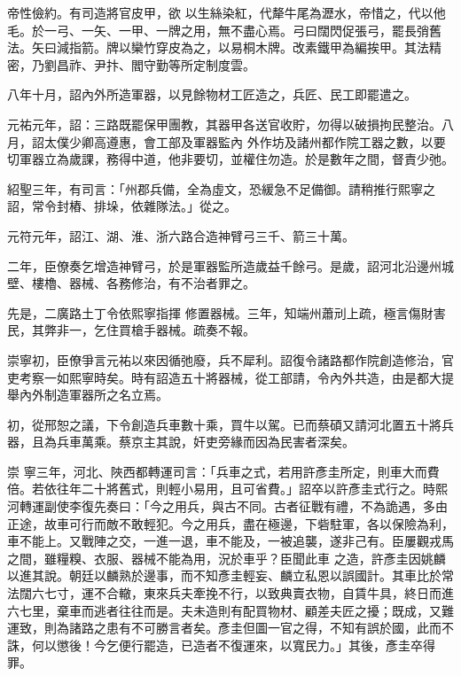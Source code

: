 \begin{pinyinscope}
 帝性儉約。有司造將官皮甲，欲
 以生絲染紅，代犛牛尾為瀝水，帝惜之，代以他毛。於一弓、一矢、一甲、一牌之用，無不盡心焉。弓曰闊閃促張弓，罷長弰舊法。矢曰減指箭。牌以欒竹穿皮為之，以易桐木牌。改素鐵甲為編挨甲。其法精密，乃劉昌祚、尹抃、閻守勤等所定制度雲。



 八年十月，詔內外所造軍器，以見餘物材工匠造之，兵匠、民工即罷遣之。



 元祐元年，詔：三路既罷保甲團教，其器甲各送官收貯，勿得以破損拘民整治。八月，詔太僕少卿高遵惠，會工部及軍器監內
 外作坊及諸州都作院工器之數，以要切軍器立為歲課，務得中道，他非要切，並權住勿造。於是數年之間，督責少弛。



 紹聖三年，有司言：「州郡兵備，全為虛文，恐緩急不足備御。請稍推行熙寧之詔，常令封樁、排垛，依雜隊法。」從之。



 元符元年，詔江、湖、淮、浙六路合造神臂弓三千、箭三十萬。



 二年，臣僚奏乞增造神臂弓，於是軍器監所造歲益千餘弓。是歲，詔河北沿邊州城壁、樓櫓、器械、各務修治，有不治者罪之。



 先是，二廣路土丁令依熙寧指揮
 修置器械。三年，知端州蕭刓上疏，極言傷財害民，其弊非一，乞住買槍手器械。疏奏不報。



 崇寧初，臣僚爭言元祐以來因循弛廢，兵不犀利。詔復令諸路都作院創造修治，官吏考察一如熙寧時矣。時有詔造五十將器械，從工部請，令內外共造，由是都大提舉內外制造軍器所之名立焉。



 初，從邢恕之議，下令創造兵車數十乘，買牛以駕。已而蔡碩又請河北置五十將兵器，且為兵車萬乘。蔡京主其說，奸吏旁緣而因為民害者深矣。



 崇
 寧三年，河北、陜西都轉運司言：「兵車之式，若用許彥圭所定，則車大而費倍。若依往年二十將舊式，則輕小易用，且可省費。」詔卒以許彥圭式行之。時熙河轉運副使李復先奏曰：「今之用兵，與古不同。古者征戰有禮，不為詭遇，多由正途，故車可行而敵不敢輕犯。今之用兵，盡在極邊，下砦駐軍，各以保險為利，車不能上。又戰陣之交，一進一退，車不能及，一被追襲，遂非己有。臣屢觀戎馬之間，雖糧糗、衣服、器械不能為用，況於車乎？臣聞此車
 之造，許彥圭因姚麟以進其說。朝廷以麟熟於邊事，而不知彥圭輕妄、麟立私恩以誤國計。其車比於常法闊六七寸，運不合轍，東來兵夫牽挽不行，以致典賣衣物，自賃牛具，終日而進六七里，棄車而逃者往往而是。夫未造則有配買物材、顧差夫匠之擾；既成，又難運致，則為諸路之患有不可勝言者矣。彥圭但圖一官之得，不知有誤於國，此而不誅，何以懲後！今乞便行罷造，已造者不復運來，以寬民力。」其後，彥圭卒得罪。




\end{pinyinscope}
